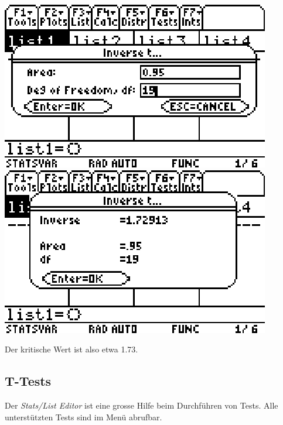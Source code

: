 \documentclass[a4paper,11pt,notitlepage,halfparskip,headsepline,normalheadings,twoside]{scrartcl}
\newlength{\tikey}
\newcommand{\keystroke}[1]{\settowidth{\tikey}{\scriptsize #1}\psframebox[framearc=0.2]{\parbox{\tikey}{\scriptsize\textsf{#1}}}}
\begin{document}
\begin{center}
\includegraphics{eps/tdist1}
\includegraphics{eps/tdist2}
\end{center}

Der kritische Wert ist also etwa 1.73.

\subsection{T-Tests}
Der \textit{Stats/List Editor} ist eine grosse Hilfe beim Durchführen von Tests.
Alle unterstützten Tests sind im Menü \keystroke{F6} abrufbar.
\end{document}
